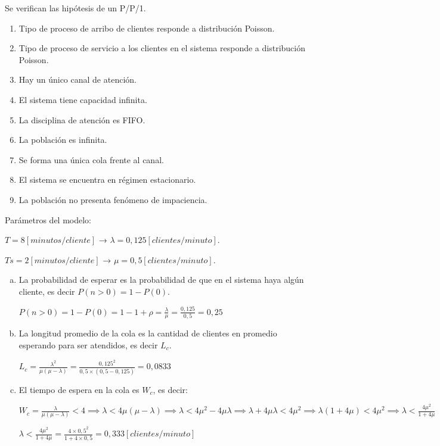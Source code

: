 \documentclass[a4paper,11pt]{article}
\begin{document}
Se verifican las hipótesis de un P/P/1.

\begin{enumerate}[1.]
  \item Tipo de proceso de arribo de clientes responde a distribución Poisson.
  \item Tipo de proceso de servicio a los clientes en el sistema responde a
    distribución Poisson.
  \item Hay un único canal de atención.
  \item El sistema tiene capacidad infinita.
  \item La disciplina de atención es FIFO.
  \item La población es infinita.
  \item Se forma una única cola frente al canal.
  \item El sistema se encuentra en régimen estacionario.
  \item La población no presenta fenómeno de impaciencia.
\end{enumerate}

\vspace{13pt}
Parámetros del modelo:

$T = 8 [minutos/cliente]$ →  $\lambda = 0,125 [clientes/minuto]$.

$Ts = 2 [minutos/cliente]$ → $\mu = 0,5 [clientes/minuto]$.

\begin{enumerate}[a)]
  \vspace{13pt}
  \item La probabilidad de esperar es la probabilidad de que en el sistema haya
    algún cliente, es decir $P(n>0) = 1 - P(0)$.

  $P(n>0) = 1 - P(0) = 1-1+\rho = \frac{\lambda}{\mu} = \frac{0,125}{0,5} =
  0,25$

  \vspace{13pt}
  \item La longitud promedio de la cola es la cantidad de clientes en promedio
    esperando para ser atendidos, es decir $L_c$.

  $L_c = \frac{\lambda^2}{\mu(\mu-\lambda)} = \frac{0,125^2}{0,5 \times
  (0,5-0,125)} = 0,0833$

  \vspace{13pt}
  \item El tiempo de espera en la cola es $W_c$, es decir:

  $W_c = \frac{\lambda}{\mu(\mu-\lambda)} < 4 \implies \lambda < 4
  \mu(\mu-\lambda) \implies \lambda < 4 \mu^2-4\mu\lambda \implies \lambda +
  4\mu\lambda < 4 \mu^2 \implies \lambda(1 + 4\mu) < 4\mu^2 \implies \lambda <
  \frac{4\mu^2}{1+4\mu}$

  $\lambda < \frac{4\mu^2}{1+4\mu} = \frac{4\times0,5^2}{1+4\times0,5} =
  0,333[clientes/minuto]$
\end{enumerate}
\end{document}

